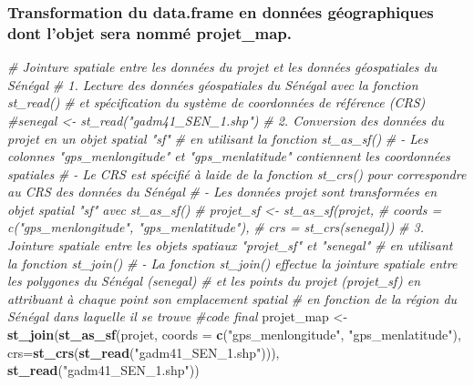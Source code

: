 \documentclass[
]{article}
\newenvironment{Shaded}{\begin{snugshade}}{\end{snugshade}}
\newcommand{\AttributeTok}[1]{\textcolor[rgb]{0.13,0.29,0.53}{#1}}
\newcommand{\CommentTok}[1]{\textcolor[rgb]{0.56,0.35,0.01}{\textit{#1}}}
\newcommand{\FunctionTok}[1]{\textcolor[rgb]{0.13,0.29,0.53}{\textbf{#1}}}
\newcommand{\NormalTok}[1]{#1}
\newcommand{\OtherTok}[1]{\textcolor[rgb]{0.56,0.35,0.01}{#1}}
\newcommand{\StringTok}[1]{\textcolor[rgb]{0.31,0.60,0.02}{#1}}
\begin{document}
\hypertarget{transformation-du-data.frame-en-donnuxe9es-guxe9ographiques-dont-lobjet-sera-nommuxe9-projet_map.}{%
\subsubsection{\texorpdfstring{Transformation du \textbf{data.frame} en
données géographiques dont l'objet sera nommé
\textbf{projet\_map}.}{Transformation du data.frame en données géographiques dont l'objet sera nommé projet\_map.}}\label{transformation-du-data.frame-en-donnuxe9es-guxe9ographiques-dont-lobjet-sera-nommuxe9-projet_map.}}

\begin{Shaded}
\begin{Highlighting}[]
\CommentTok{\# Jointure spatiale entre les données du projet et les données géospatiales du Sénégal}
\CommentTok{\# 1. Lecture des données géospatiales du Sénégal avec la fonction st\_read()}
\CommentTok{\# et spécification du système de coordonnées de référence (CRS)}
\CommentTok{\#senegal \textless{}{-} st\_read("gadm41\_SEN\_1.shp")}
\CommentTok{\# 2. Conversion des données du projet en un objet spatial "sf"}
\CommentTok{\# en utilisant la fonction st\_as\_sf()}
\CommentTok{\# {-} Les colonnes "gps\_menlongitude" et "gps\_menlatitude" contiennent les coordonnées spatiales}
\CommentTok{\# {-} Le CRS est spécifié à l\textquotesingle{}aide de la fonction st\_crs() pour correspondre au CRS des données du Sénégal}
\CommentTok{\# {-} Les données projet sont transformées en objet spatial "sf" avec st\_as\_sf()}
\CommentTok{\# projet\_sf \textless{}{-} st\_as\_sf(projet, }
\CommentTok{\#                       coords = c("gps\_menlongitude", "gps\_menlatitude"), }
\CommentTok{\#                       crs = st\_crs(senegal))}
\CommentTok{\# 3. Jointure spatiale entre les objets spatiaux "projet\_sf" et "senegal"}
\CommentTok{\# en utilisant la fonction st\_join()}
\CommentTok{\# {-} La fonction st\_join() effectue la jointure spatiale entre les polygones du Sénégal (senegal)}
\CommentTok{\#   et les points du projet (projet\_sf) en attribuant à chaque point son emplacement spatial}
\CommentTok{\#   en fonction de la région du Sénégal dans laquelle il se trouve}
\CommentTok{\#code final}
\NormalTok{projet\_map }\OtherTok{\textless{}{-}} \FunctionTok{st\_join}\NormalTok{(}\FunctionTok{st\_as\_sf}\NormalTok{(projet, }
                      \AttributeTok{coords =} \FunctionTok{c}\NormalTok{(}\StringTok{"gps\_menlongitude"}\NormalTok{, }\StringTok{"gps\_menlatitude"}\NormalTok{), }
                      \AttributeTok{crs=}\FunctionTok{st\_crs}\NormalTok{(}\FunctionTok{st\_read}\NormalTok{(}\StringTok{"gadm41\_SEN\_1.shp"}\NormalTok{))),}
                      \FunctionTok{st\_read}\NormalTok{(}\StringTok{"gadm41\_SEN\_1.shp"}\NormalTok{))}
\end{Highlighting}
\end{Shaded}
\end{document}
